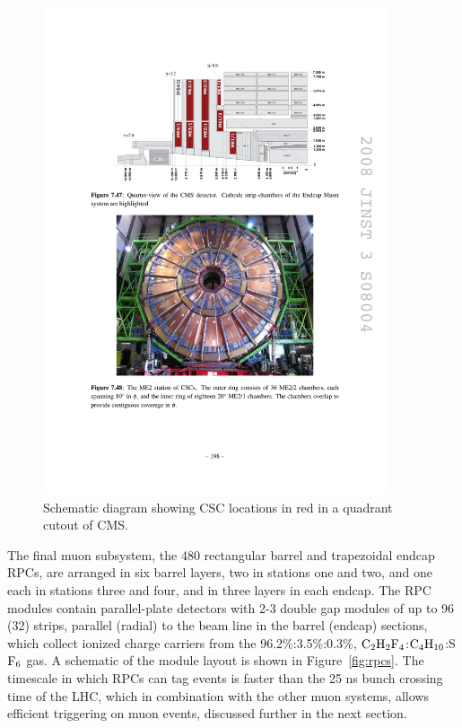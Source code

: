 \begin{figure}[tbh]
\centering
\includegraphics[width=4in]{figures/cscs.pdf}
\caption{Schematic diagram showing CSC locations in red in a quadrant cutout of CMS.}
\label{fig:cscs}
\end{figure}

The final muon subsystem, the 480 rectangular barrel and trapezoidal endcap RPCs, are arranged in six barrel layers, two in stations one and two, and one each in stations three and four, and in three layers in each endcap. The RPC modules contain parallel-plate detectors with 2-3 double gap modules of up to 96 (32) strips, parallel (radial) to the beam line in the barrel (endcap) sections, which collect ionized charge carriers from the 96.2\%:3.5\%:0.3\%, $\rm{C}_2\rm{H}_2\rm{F}_4$:$\rm{C}_4\rm{H}_{10}$:S$\rm{F}_6$ gas. A schematic of the module layout is shown in Figure~\ref{fig:rpcs}. The timescale in which RPCs can tag events is faster than the 25 ns bunch crossing time of the LHC, which in combination with the other muon systems, allows efficient triggering on muon events, discussed further in the next section.


